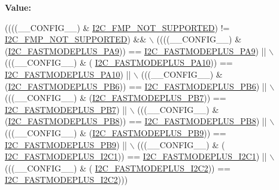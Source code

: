 {\bfseries Value\+:}
\begin{DoxyCode}
((((\_\_CONFIG\_\_) & \hyperlink{group___i2_c_ex___fast_mode_plus_ga3a3da061fa78faa209f0feb39e20ef43}{I2C\_FMP\_NOT\_SUPPORTED}) != 
      \hyperlink{group___i2_c_ex___fast_mode_plus_ga3a3da061fa78faa209f0feb39e20ef43}{I2C\_FMP\_NOT\_SUPPORTED}) && \(\backslash\)
                                         ((((\_\_CONFIG\_\_) & (\hyperlink{group___i2_c_ex___fast_mode_plus_ga2e335d4993c228bb7aa778890e29ce57}{I2C\_FASTMODEPLUS\_PA9}))  == 
      \hyperlink{group___i2_c_ex___fast_mode_plus_ga2e335d4993c228bb7aa778890e29ce57}{I2C\_FASTMODEPLUS\_PA9})     || \(\backslash\)
                                          (((\_\_CONFIG\_\_) & (
      \hyperlink{group___i2_c_ex___fast_mode_plus_gacef0dcd4551b31cb585fa7e7044a50da}{I2C\_FASTMODEPLUS\_PA10})) == \hyperlink{group___i2_c_ex___fast_mode_plus_gacef0dcd4551b31cb585fa7e7044a50da}{I2C\_FASTMODEPLUS\_PA10})    || \(\backslash\)
                                          (((\_\_CONFIG\_\_) & (\hyperlink{group___i2_c_ex___fast_mode_plus_ga9b3b77b0f00f09ee6d272d70dd5663f5}{I2C\_FASTMODEPLUS\_PB6}))  == 
      \hyperlink{group___i2_c_ex___fast_mode_plus_ga9b3b77b0f00f09ee6d272d70dd5663f5}{I2C\_FASTMODEPLUS\_PB6})     || \(\backslash\)
                                          (((\_\_CONFIG\_\_) & (\hyperlink{group___i2_c_ex___fast_mode_plus_gaaa6d3f6c1d635a2f5e4dbe2ef66ce1c3}{I2C\_FASTMODEPLUS\_PB7}))  == 
      \hyperlink{group___i2_c_ex___fast_mode_plus_gaaa6d3f6c1d635a2f5e4dbe2ef66ce1c3}{I2C\_FASTMODEPLUS\_PB7})     || \(\backslash\)
                                          (((\_\_CONFIG\_\_) & (\hyperlink{group___i2_c_ex___fast_mode_plus_gaf8d6aa219f041b552b3d3cd53cb78a26}{I2C\_FASTMODEPLUS\_PB8}))  == 
      \hyperlink{group___i2_c_ex___fast_mode_plus_gaf8d6aa219f041b552b3d3cd53cb78a26}{I2C\_FASTMODEPLUS\_PB8})     || \(\backslash\)
                                          (((\_\_CONFIG\_\_) & (\hyperlink{group___i2_c_ex___fast_mode_plus_gafab6e63d100bf337bf9f0bf6a607636d}{I2C\_FASTMODEPLUS\_PB9}))  == 
      \hyperlink{group___i2_c_ex___fast_mode_plus_gafab6e63d100bf337bf9f0bf6a607636d}{I2C\_FASTMODEPLUS\_PB9})     || \(\backslash\)
                                          (((\_\_CONFIG\_\_) & (
      \hyperlink{group___i2_c_ex___fast_mode_plus_ga3a8064ecfa3b33115f62123f7162770e}{I2C\_FASTMODEPLUS\_I2C1})) == \hyperlink{group___i2_c_ex___fast_mode_plus_ga3a8064ecfa3b33115f62123f7162770e}{I2C\_FASTMODEPLUS\_I2C1})    || \(\backslash\)
                                          (((\_\_CONFIG\_\_) & (
      \hyperlink{group___i2_c_ex___fast_mode_plus_gaa5c33513afa036a6f97e9cbf2d61f4b2}{I2C\_FASTMODEPLUS\_I2C2})) == \hyperlink{group___i2_c_ex___fast_mode_plus_gaa5c33513afa036a6f97e9cbf2d61f4b2}{I2C\_FASTMODEPLUS\_I2C2})))
\end{DoxyCode}
